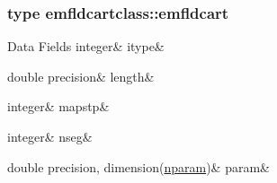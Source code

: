 \subsubsection{type emfldcartclass\+::emfldcart}
\begin{DoxyFields}{Data Fields}
\mbox{\label{namespaceemfldcartclass_a9ea1ffbf61d29a3520ad743300cfce15}} 
integer&
itype&
\\
\hline

\mbox{\label{namespaceemfldcartclass_aa2c152d23138df1a44c6ff50407ac04d}} 
double precision&
length&
\\
\hline

\mbox{\label{namespaceemfldcartclass_af80bf92550bb63b5f809ab3be6bbfe8d}} 
integer&
mapstp&
\\
\hline

\mbox{\label{namespaceemfldcartclass_acf5b75cb340cfc6f837318ed47038f25}} 
integer&
nseg&
\\
\hline

\mbox{\label{namespaceemfldcartclass_a72ab84a2cacd1906ab51cb7a6637956e}} 
double precision, dimension(\mbox{\hyperlink{namespaceemfldcartclass_a72ee7da1adbf56a707b72607da000549}{nparam}})&
param&
\\
\hline

\end{DoxyFields}
